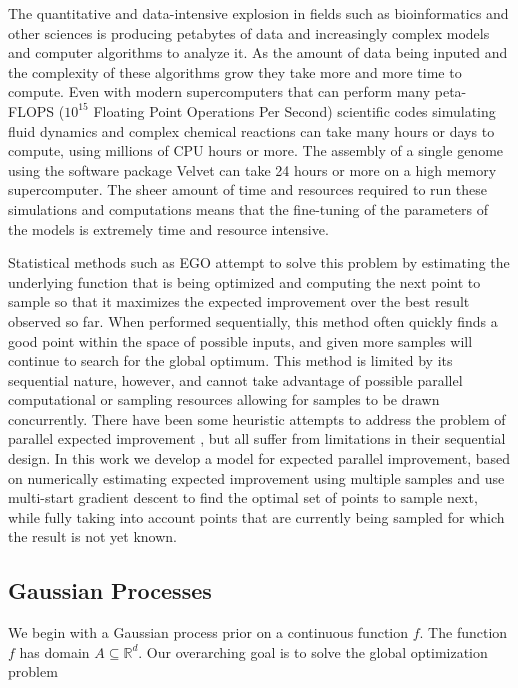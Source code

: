 The quantitative and data-intensive explosion in fields such as bioinformatics and other sciences is producing petabytes of data and increasingly complex models and computer algorithms to analyze it. As the amount of data being inputed and the complexity of these algorithms grow they take more and more time to compute. Even with modern supercomputers that can perform many peta-FLOPS ($10^{15}$ Floating Point Operations Per Second) scientific codes simulating fluid dynamics \cite{Compo2011} and complex chemical reactions \cite{Valiev2010} can take many hours or days to compute, using millions of CPU hours or more. The assembly of a single genome using the software package Velvet \cite{Zerbino2008} can take 24 hours or more on a high memory supercomputer. The sheer amount of time and resources required to run these simulations and computations means that the fine-tuning of the parameters of the models is extremely time and resource intensive.

Statistical methods such as EGO \cite{Jones1998} attempt to solve this problem by estimating the underlying function that is being optimized and computing the next point to sample so that it maximizes the expected improvement over the best result observed so far. When performed sequentially, this method often quickly finds a good point within the space of possible inputs, and given more samples will continue to search for the global optimum. This method is limited by its sequential nature, however, and cannot take advantage of possible parallel computational or sampling resources allowing for samples to be drawn concurrently. There have been some heuristic attempts to address the problem of parallel expected improvement \cite{Ginsbourger2008}, but all suffer from limitations in their sequential design. In this work we develop a model for expected parallel improvement, based on numerically estimating expected improvement using multiple samples and use multi-start gradient descent to find the optimal set of points to sample next, while fully taking into account points that are currently being sampled for which the result is not yet known.

\subsection{Gaussian Processes}

We begin with a Gaussian process prior on a continuous function $f$. The function $f$ has domain $A \subseteq \mathbb{R}^{d}$. Our overarching goal is to solve the global optimization problem


